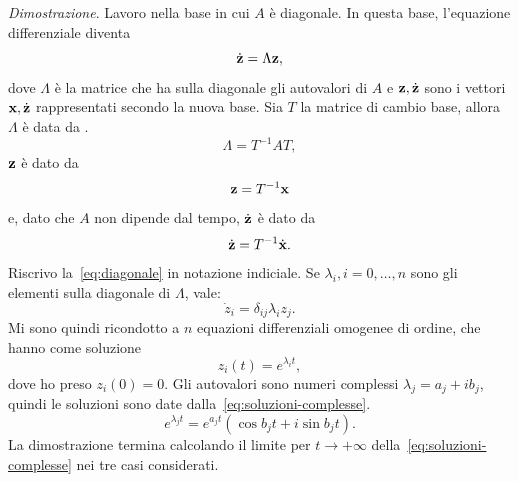 \emph{Dimostrazione}.
Lavoro nella base in cui $A$ è diagonale.
In questa base, l'equazione differenziale diventa
\begin{equation}
    \dot{\mathbf{z}} = \Lambda \mathbf{z},
    \label{eq:diagonale}
\end{equation}
dove $\Lambda$ è la matrice che ha sulla diagonale
gli autovalori di $A$ e $\mathbf{z}, \dot{\mathbf{z}}$ sono i vettori $\mathbf{x}, \dot{\mathbf{z}}$ rappresentati secondo la nuova base.
Sia $T$ la matrice di cambio base, allora $\Lambda$ è data da .
\begin{equation*}
    \Lambda = T^{-1} A T,
\end{equation*}
$\mathbf{z}$ è dato da
\begin{equation*}
    \mathbf{z} = T^{-1} \mathbf{x}
\end{equation*}
e, dato che $A$ non dipende dal tempo, $\dot{\mathbf{z}}$ è dato da
\begin{equation*}
    \dot{\mathbf{z}} = T^{-1} \dot{\mathbf{x}}.
\end{equation*}
Riscrivo la~\eqref{eq:diagonale} in notazione indiciale.
Se $\lambda_i, i = 0, \ldots, n$ sono gli elementi sulla diagonale di $\Lambda$, vale:
\begin{equation*}
    \dot z_i = \delta_{ij} \lambda_i z_j.
\end{equation*}
Mi sono quindi ricondotto a $n$ equazioni differenziali omogenee di  ordine, che
hanno come soluzione
\begin{equation*}
    z_i(t) = e^{\lambda_i t},
\end{equation*}
dove ho preso $z_i(0) = 0$.
Gli autovalori sono numeri complessi $\lambda_j = a_j + i b_j$, quindi le soluzioni
sono date dalla~\eqref{eq:soluzioni-complesse}.
\begin{equation}
    e^{\lambda_j t} = e^{a_j t}\left(\cos{b_j t} + i\sin{b_j t} \right).
\label{eq:soluzioni-complesse}
\end{equation}
La dimostrazione termina calcolando il limite per $t \to +\infty$
della~\eqref{eq:soluzioni-complesse} nei tre casi considerati.

\hfill \qedsymbol
